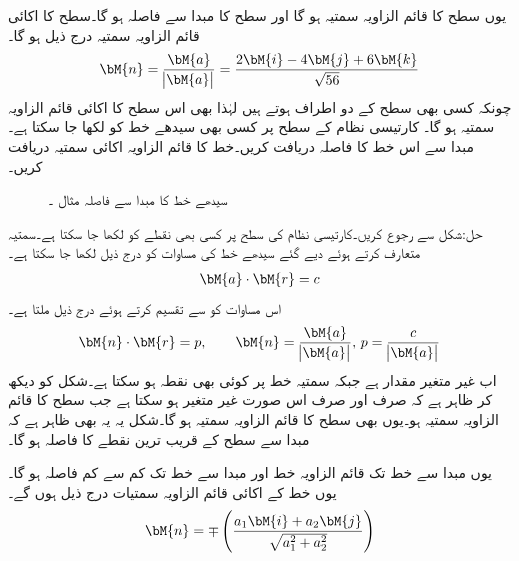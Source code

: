 یوں سطح  کا قائم الزاویہ سمتیہ  ہو گا اور سطح کا مبدا سے فاصلہ
  ہو گا۔سطح کا اکائی قائم الزاویہ سمتیہ درج ذیل ہو گا۔
\begin{align*}
\bM{n}=\frac{\bM{a}}{\abs{\bM{a}}}=\frac{2\bM{i}-4\bM{j}+6\bM{k}}{\sqrt{56}}
\end{align*}
چونکہ کسی بھی سطح کے دو اطراف ہوتے ہیں لہٰذا  بھی اس سطح کا اکائی قائم الزاویہ سمتیہ ہو گا۔
کارتیسی نظام کے  سطح پر کسی بھی سیدھے خط  کو  لکھا جا سکتا ہے۔مبدا سے اس خط کا فاصلہ دریافت کریں۔خط کا قائم الزاویہ اکائی سمتیہ دریافت کریں۔
\begin{figure}
\centering
{}
\caption{سیدھے خط کا مبدا سے فاصلہ مثال ۔}
\label{شکل_مثال_سمتیہ_مرکز_سے_فاصلہ}
\end{figure}

حل:شکل  سے رجوع کریں۔کارتیسی نظام کی  سطح پر کسی بھی نقطے کو  لکھا جا سکتا ہے۔سمتیہ  متعارف کرتے ہوئے دیے گئے سیدھے خط کی مساوات کو درج ذیل لکھا جا سکتا ہے۔
\begin{align*}
\bM{a}\cdot \bM{r}=c
\end{align*} 
اس مساوات کو  سے تقسیم کرتے ہوئے درج ذیل ملتا ہے۔
\begin{align*}
\bM{n}\cdot \bM{r}=p,\quad \quad \bM{n}=\frac{\bM{a}}{\abs{\bM{a}}},\, p=\frac{c}{\abs{\bM{a}}}
\end{align*}
اب  غیر متغیر مقدار ہے جبکہ سمتیہ  خط پر کوئی بھی نقطہ ہو سکتا ہے۔شکل کو دیکھ کر ظاہر ہے کہ  صرف اور صرف اس صورت غیر متغیر ہو سکتا ہے جب  سطح کا قائم الزاویہ سمتیہ ہو۔یوں  بھی سطح کا قائم الزاویہ سمتیہ ہو گا۔شکل یہ یہ بھی ظاہر ہے کہ مبدا سے سطح کے قریب ترین نقطے کا فاصلہ  ہو گا۔

یوں مبدا سے خط تک قائم الزاویہ خط  اور مبدا سے خط تک کم سے کم فاصلہ  ہو گا۔یوں خط کے اکائی قائم الزاویہ سمتیات درج ذیل ہوں گے۔
\begin{align*}
\bM{n}=\mp \left(\frac{a_1\bM{i}+a_2\bM{j}}{\sqrt{a_1^2+a_2^2}}\right)
\end{align*} 

